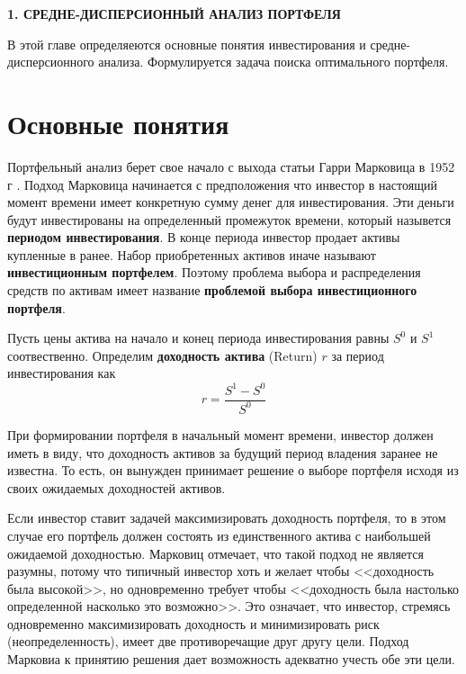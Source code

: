 \newpage
\begin{center}
	\textbf{\large 1. СРЕДНЕ-ДИСПЕРСИОННЫЙ АНАЛИЗ ПОРТФЕЛЯ}
\end{center}

В этой главе определяеются основные понятия инвестирования и средне-дисперсионного анализа.
Формулируется задача поиска оптимального портфеля.

\section{Основные понятия}

Портфельный анализ берет свое начало с выхода статьи Гарри Марковица в 1952 г \cite{markowitz}. Подход Марковица начинается с предположения что инвестор в 
настоящий момент времени имеет конкретную сумму денег для инвестирования. Эти деньги будут инвестированы на определенный промежуток
времени, который назывется \textbf{периодом инвестирования}. В конце периода инвестор продает активы купленные в
ранее. 
Набор приобретенных активов иначе называют \textbf{инвестиционным портфелем}. Поэтому проблема выбора и распределения
средств по активам имеет название \textbf{проблемой выбора инвестиционного портфеля}.

Пусть цены актива на начало и конец периода инвестирования равны $S^0$ и $S^1$ соотвественно.
Определим \textbf{доходность актива} (Return) $r$ за период инвестирования как
\[
\label{eq:ROI}
	r = \frac{S^1 - S^0}{S^0}
\]

При формировании портфеля в начальный момент времени, инвестор должен иметь в виду, что доходность активов
за будущий период владения заранее не известна. То есть, он вынужден принимает решение о выборе портфеля исходя из 
своих ожидаемых доходностей активов. 

Если инвестор ставит задачей максимизировать доходность портфеля, то в этом случае его портфель должен состоять из единственного
актива с наибольшей ожидаемой доходностью. Марковиц отмечает, что такой подход не является разумны, потому что типичный инвестор
хоть и желает чтобы <<доходность была высокой>>, но одновременно требует чтобы <<доходность была настолько определенной насколько
это возможно>>. Это означает, что инвестор, стремясь одновременно максимизировать доходность и минимизировать риск 
(неопределенность), имеет две противоречащие друг другу цели. Подход Марковиа к принятию решения дает возможность адекватно 
учесть обе эти цели.

